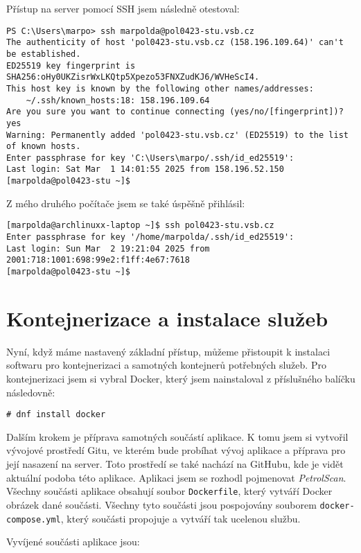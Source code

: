 Přístup na server pomocí SSH jsem následně otestoval:
\begin{verbatim}
PS C:\Users\marpo> ssh marpolda@pol0423-stu.vsb.cz
The authenticity of host 'pol0423-stu.vsb.cz (158.196.109.64)' can't be established.
ED25519 key fingerprint is SHA256:oHy0UKZisrWxLKQtp5Xpezo53FNXZudKJ6/WVHeScI4.
This host key is known by the following other names/addresses:
    ~/.ssh/known_hosts:18: 158.196.109.64
Are you sure you want to continue connecting (yes/no/[fingerprint])? yes
Warning: Permanently added 'pol0423-stu.vsb.cz' (ED25519) to the list of known hosts.
Enter passphrase for key 'C:\Users\marpo/.ssh/id_ed25519':
Last login: Sat Mar  1 14:01:55 2025 from 158.196.52.150
[marpolda@pol0423-stu ~]$
\end{verbatim}

Z mého druhého počítače jsem se také úspěšně přihlásil:
\begin{verbatim}
[marpolda@archlinuxx-laptop ~]$ ssh pol0423-stu.vsb.cz
Enter passphrase for key '/home/marpolda/.ssh/id_ed25519':
Last login: Sun Mar  2 19:21:04 2025 from 2001:718:1001:698:99e2:f1ff:4e67:7618
[marpolda@pol0423-stu ~]$
\end{verbatim}

\section{Kontejnerizace a instalace služeb}
Nyní, když máme nastavený základní přístup, můžeme přistoupit
k instalaci softwaru pro kontejnerizaci a samotných kontejnerů
potřebných služeb. Pro kontejnerizaci jsem si vybral Docker,
který jsem nainstaloval z příslušného balíčku následovně:

\begin{verbatim}
# dnf install docker
\end{verbatim}

Dalším krokem je příprava samotných součástí aplikace. K tomu
jsem si vytvořil vývojové prostředí Gitu, ve kterém bude
probíhat vývoj aplikace a příprava pro její nasazení na server.
Toto prostředí se také nachází na GitHubu, kde je vidět
aktuální podoba této aplikace. Aplikaci jsem se rozhodl pojmenovat
\emph{PetrolScan}. Všechny součásti aplikace obsahují soubor
\texttt{Dockerfile}, který vytváří Docker obrázek dané součásti.
Všechny tyto součásti jsou pospojovány souborem \texttt{docker-compose.yml},
který součásti propojuje a vytváří tak ucelenou službu.

Vyvíjené součásti aplikace jsou:

